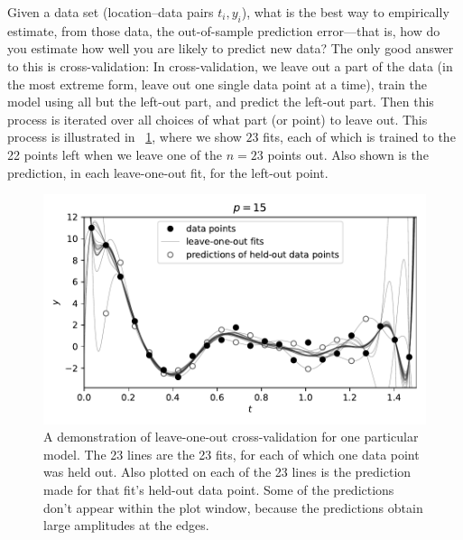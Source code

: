 \documentclass[12pt,letterpaper]{article}
\newlength{\figurewidth}
\begin{document}
Given a data set (location--data pairs $t_i, y_i$), what is the best way to empirically estimate, from those data, the out-of-sample prediction error---that is, how do you estimate how well you are likely to predict new data?
The only good answer to this is cross-validation:
In cross-validation, we leave out a part of the data (in the most extreme form, leave out one single data point at a time), train the model using all but the left-out part, and predict the left-out part. Then this process is iterated over all choices of what part (or point) to leave out.
This process is illustrated in \figurename~\ref{fig:loo}, where we show $23$ fits, each of which is trained to the 22 points left when we leave one of the $n=23$ points out.
Also shown is the prediction, in each leave-one-out fit, for the left-out point.
\begin{figure}[t]
    \begin{mdframed}
    \includegraphics[width=\figurewidth]{paper/LOO.pdf}
    \caption{A demonstration of leave-one-out cross-validation for one particular model. The 23 lines are the 23 fits, for each of which one data point was held out. Also plotted on each of the 23 lines is the prediction made for that fit's held-out data point. Some of the predictions don't appear within the plot window, because the predictions obtain large amplitudes at the edges.}
    \label{fig:loo}
    \end{mdframed}
\end{figure}
\end{document}
